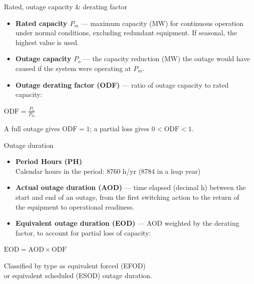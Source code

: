 \begin{frame}{Rated, outage capacity \& derating factor}
  \begin{itemize}
    \setlength{\itemsep}{0.5em}
    \item \textbf{Rated capacity $P_m$} — maximum capacity (MW) for continuous operation under normal conditions, excluding redundant equipment.
          If seasonal, the highest value is used.
    \item \textbf{Outage capacity $P_o$} — the capacity reduction (MW) the outage would have caused if the system were operating at $P_m$.
    \item \textbf{Outage derating factor (ODF)} — ratio of outage capacity to rated capacity:
  \end{itemize}
  \vspace{0.4em}
  {\centering\large $\displaystyle \mathrm{ODF} = \frac{P_o}{P_m}$ \par}
  \vspace{0.3em}
  \centering
  {\color{atGray}\footnotesize A full outage gives $\mathrm{ODF}=1$; a partial loss gives $0<\mathrm{ODF}<1$.}
\end{frame}

\begin{frame}{Outage duration}
  \begin{itemize}
    \setlength{\itemsep}{0.6em}
    \item \textbf{Period Hours (PH)}\\Calendar hours in the period: 8760 h/yr (8784 in a leap year)
    \item \textbf{Actual outage duration (AOD)} — time elapsed (decimal h)
          between the start and end of an outage, from the first switching
          action to the return of the equipment to operational readiness.
    \item \textbf{Equivalent outage duration (EOD)} — AOD weighted by the
          derating factor, to account for partial loss of capacity:
  \end{itemize}
  \vspace{0.5em}
  {\centering\large $\displaystyle \mathrm{EOD} = \mathrm{AOD}\times \mathrm{ODF}$ \par}
  \vspace{0.5em}
  \centering
  {\color{atGray}\footnotesize Classified by type as equivalent forced (EFOD)\\ or equivalent scheduled (ESOD) outage duration.}
\end{frame}

